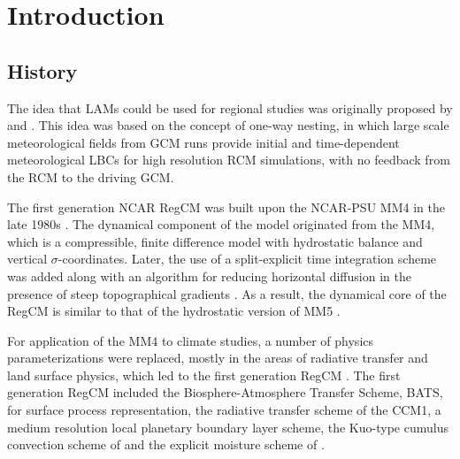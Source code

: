 \section{Introduction}

\subsection{History}

The idea that \ac{LAMs} could be used for regional studies was originally
proposed by \citet{Dickinson_89} and \citet{Giorgi_90}. This idea was based on
the concept of one-way nesting, in which large scale meteorological fields from
\ac{GCM} runs provide initial and time-dependent meteorological \ac{LBCs} for
high resolution \ac{RCM} simulations, with no feedback from the \ac{RCM} to the
driving \ac{GCM}.

The first generation NCAR \ac{RegCM} was built upon the \ac{NCAR}-\ac{PSU}
\ac{MM4} in the late 1980s \citep{Dickinson_89,Giorgi_89}. The dynamical
component of the model originated from the \ac{MM4}, which is a compressible,
finite difference model with hydrostatic balance and vertical
$\sigma$-coordinates. Later, the use of a split-explicit time integration
scheme was added along with an algorithm for reducing horizontal diffusion in
the presence of steep topographical gradients \citep{Giorgi_93,Giorgi_93b}.  As
a result, the dynamical core of the \ac{RegCM} is similar to that of the
hydrostatic version of \ac{MM5} \citep{Grell_94}.

For application of the \ac{MM4} to climate studies, a number of physics
parameterizations were replaced, mostly in the areas of radiative transfer and
land surface physics, which led to the first generation \ac{RegCM}
\citep{Dickinson_89,Giorgi_90}. The first generation \ac{RegCM} included the
Biosphere-Atmosphere Transfer Scheme, BATS, \citep{Dickinson_86} for surface
process representation, the radiative transfer scheme of the \ac{CCM1}, a
medium resolution local planetary boundary layer scheme, the Kuo-type cumulus
convection scheme of \citep{Anthes_77} and the explicit moisture scheme of
\citep{Hsie_84}.

